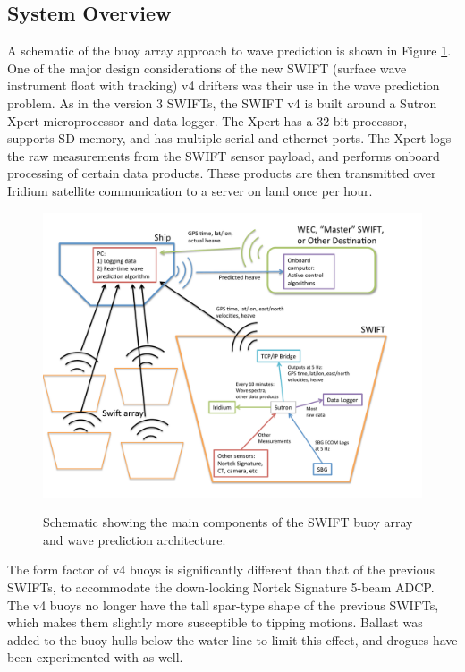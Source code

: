 \documentclass[11pt]{amsart}
\begin{document}
\subsection{System Overview}

A schematic of the buoy array approach to wave prediction is shown in Figure \ref{fig:WavePredictionSchematic}.  One of the major design considerations of the new SWIFT (surface wave instrument float with tracking) v4 drifters was their use in the wave prediction problem.  As in the version 3 SWIFTs, the SWIFT v4 is built around a Sutron Xpert microprocessor and data logger.  The Xpert has a 32-bit processor, supports SD memory, and has multiple serial and ethernet ports.  The Xpert logs the raw measurements from the SWIFT sensor payload, and performs onboard processing of certain data products.  These products are then transmitted over Iridium satellite communication to a server on land once per hour.

\begin{figure}[t]
    \centering
    \noindent\includegraphics[width=5.5in]{WavePredictionSchematic.pdf}\\
   \vspace{-0in}\caption{Schematic showing the main components of the SWIFT buoy array and wave prediction architecture.}\label{fig:WavePredictionSchematic}
\end{figure}

The form factor of v4 buoys is significantly different than that of the previous SWIFTs, to accommodate the down-looking Nortek Signature 5-beam ADCP.  The v4 buoys no longer have the tall spar-type shape of the previous SWIFTs, which makes them slightly more susceptible to tipping motions.  Ballast was added to the buoy hulls below the water line to limit this effect, and drogues have been experimented with as well.  
\end{document}
